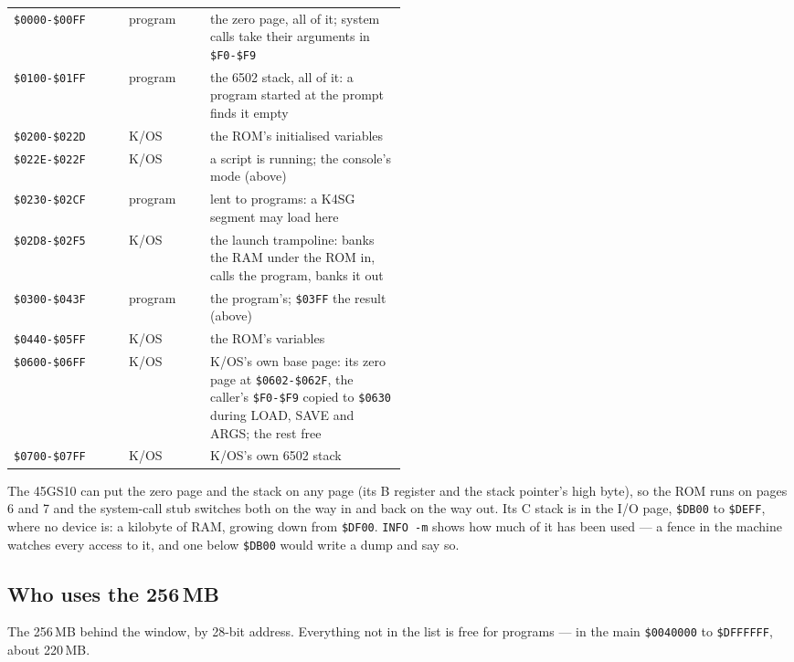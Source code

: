 \begin{center}
\small
\begin{tabular}{@{}l l >{\raggedright\arraybackslash}p{0.50\linewidth}@{}}
\toprule
\texttt{\$0000-\$00FF} & program & the zero page, all of it; system calls take their arguments in \texttt{\$F0-\$F9}\\
\texttt{\$0100-\$01FF} & program & the 6502 stack, all of it: a program started at the prompt finds it empty\\
\texttt{\$0200-\$022D} & K/OS    & the ROM's initialised variables\\
\texttt{\$022E-\$022F} & K/OS    & a script is running; the console's mode (above)\\
\texttt{\$0230-\$02CF} & program & lent to programs: a K4SG segment may load here\\
\texttt{\$02D8-\$02F5} & K/OS    & the launch trampoline: banks the RAM under the ROM in, calls the program, banks it out\\
\texttt{\$0300-\$043F} & program & the program's; \texttt{\$03FF} the result (above)\\
\texttt{\$0440-\$05FF} & K/OS    & the ROM's variables\\
\texttt{\$0600-\$06FF} & K/OS    & K/OS's own base page: its zero page at \texttt{\$0602-\$062F}, the caller's \texttt{\$F0-\$F9} copied to \texttt{\$0630} during LOAD, SAVE and ARGS; the rest free\\
\texttt{\$0700-\$07FF} & K/OS    & K/OS's own 6502 stack\\
\bottomrule
\end{tabular}
\end{center}

\noindent The 45GS10 can put the zero page and the stack on any page
(its B register and the stack pointer's high byte), so the ROM runs on
pages 6 and 7 and the system-call stub switches both on the way in and
back on the way out. Its C stack is in the I/O page, \texttt{\$DB00} to
\texttt{\$DEFF}, where no device is: a kilobyte of RAM, growing down
from \texttt{\$DF00}. \verb|INFO -m| shows how much of it has been
used --- a fence in the machine watches every access to it, and one
below \texttt{\$DB00} would write a dump and say so.

\subsection{Who uses the 256\,MB}\label{sec:physmap}
The 256\,MB behind the window, by 28-bit address. Everything not in the
list is free for programs --- in the main \texttt{\$0040000} to
\texttt{\$DFFFFFF}, about 220\,MB.

